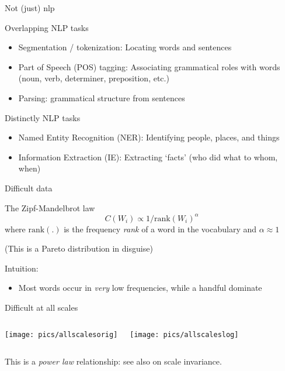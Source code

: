 \documentclass{hertieteaching}
\begin{document}
\begin{frame}{Not (just) nlp}

Overlapping NLP tasks
\begin{itemize}
  \item Segmentation / tokenization: Locating words and sentences
  \item Part of Speech (POS) tagging: Associating grammatical
         roles with words (noun, verb, determiner, preposition, etc.)
  \item Parsing: grammatical structure from sentences
\end{itemize}
Distinctly NLP tasks
\begin{itemize}
  \item Named Entity Recognition (NER): Identifying people, places, and things
  \item Information Extraction (IE): Extracting `facts' (who did what to whom, when)
\end{itemize}

%
%

\end{frame}

\begin{frame}{Difficult data}

The Zipf-Mandelbrot law \parencite{Zipf1932,Mandelbrot1966}
$$
C(W_i) \propto 1/{\text{rank}(W_i)^\alpha}
$$
where $\text{rank}(.)$ is the
frequency \textit{rank} of a word in the vocabulary and
$\alpha\approx 1$

(This is a Pareto distribution in disguise)

\pause

\bigskip
Intuition: 
\begin{itemize}
  \item Most words occur in \textit{very} low frequencies, while a handful dominate
\end{itemize}


\end{frame}

\begin{frame}{Difficult at all scales}

\begin{columns}[T,onlytextwidth]

\centerline{\texttt{[image: pics/allscalesorig]}}


\centerline{\texttt{[image: pics/allscaleslog]}}

\end{columns}

This is a \textit{power law} relationship: see also \textcite{Chater.Brown1999} on scale invariance.

\end{frame}
\end{document}
